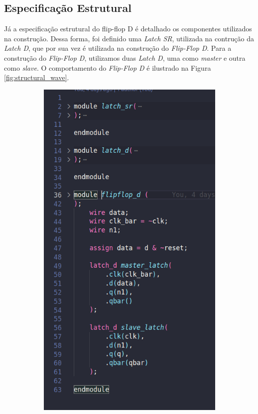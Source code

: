 \documentclass{article}
\begin{document}
\subsection{Especificação Estrutural}
Já a especificação estrutural do flip-flop D é detalhado os componentes utilizados na construção. Dessa forma, foi definido uma \emph{Latch SR}, utilizada na contrução da \emph{Latch D}, que por sua vez é utilizada na construção do \emph{Flip-Flop D}. 
Para a construção do \emph{Flip-Flop D}, utilizamos duas \emph{Latch D}, uma como \emph{master} e outra como \emph{slave}. O comportamento do \emph{Flip-Flop D} é ilustrado na Figura \ref{fig:structural_wave}.

\begin{figure}[H]
    \centering
    \hfill
    \begin{subfigure}[c]{0.3\textwidth}
        \centering
        \includegraphics[width=\textwidth]{images/dflipflop_structural_code.png}

\end{subfigure}
\end{figure}
\end{document}
